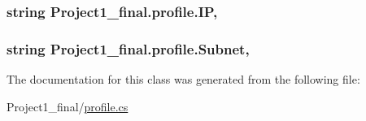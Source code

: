 \hypertarget{class_project1__final_1_1profile_a7354777c5baffe025ba85505c07bbf4a}{
\subsubsection[{I\+P}]{\setlength{\rightskip}{0pt plus 5cm}string Project1\+\_\+final.\+profile.\+I\+P\hspace{0.3cm}{\ttfamily [get]}, {\ttfamily [set]}}}\label{class_project1__final_1_1profile_a7354777c5baffe025ba85505c07bbf4a}
\hypertarget{class_project1__final_1_1profile_a8844e220fb9d0f6321abbc464aae1bbd}{
\subsubsection[{Subnet}]{\setlength{\rightskip}{0pt plus 5cm}string Project1\+\_\+final.\+profile.\+Subnet\hspace{0.3cm}{\ttfamily [get]}, {\ttfamily [set]}}}\label{class_project1__final_1_1profile_a8844e220fb9d0f6321abbc464aae1bbd}


The documentation for this class was generated from the following file\+:\begin{DoxyCompactItemize}
\item 
Project1\+\_\+final/\hyperlink{profile_8cs}{profile.\+cs}\end{DoxyCompactItemize}

